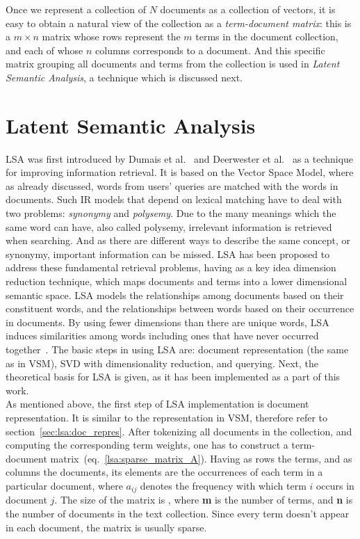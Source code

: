 Once we represent a collection of $N$ documents as a collection of vectors, it is easy to obtain a natural view of the collection as a \textit{term-document matrix}: this is a $m \times n$ matrix whose rows represent the $m$ terms in the document collection, and each of whose $n$ columns corresponds to a document. And this specific matrix grouping all documents and terms from the collection is used in \textit{Latent Semantic Analysis}, a technique which is discussed next.\\

\section{Latent Semantic Analysis}
\gls{LSA} was first introduced by Dumais et al.~\cite{Dumais88usingLSA} and Deerwester et al.~\cite{Deerw90_LSA} as a technique for improving information retrieval. It is based on the Vector Space Model, where as already discussed, words from users' queries are matched with the words in documents. Such \gls{IR} models that depend on lexical matching have to deal with two problems: \textit{synonymy} and \textit{polysemy}. Due to the many meanings which the same word can have, also called polysemy, irrelevant information is retrieved when searching. And as there are different ways to describe the same concept, or synonymy, important information can be missed. \gls{LSA} has been proposed to address these fundamental retrieval problems, having as a key idea dimension reduction technique, which maps documents and terms into a lower dimensional semantic space. \gls{LSA} models the relationships among documents based on their constituent words, and the relationships between words based on their occurrence in documents. By using fewer dimensions than there are unique words, \gls{LSA} induces similarities among words including ones that have never occurred together~\cite{Dumais2006}. The basic steps in using \gls{LSA} are: document representation (the same as in \gls{VSM}), \gls{SVD} with dimensionality reduction, and querying. Next, the theoretical basis for \gls{LSA} is given, as it has been implemented as a part of this work. \\


As mentioned above, the first step of \gls{LSA} implementation is document representation. It is similar to the representation in \gls{VSM}, therefore refer to section~\ref{sec:lsa:doc_repres}. After tokenizing all documents in the collection, and computing the corresponding term weights, one has to construct a term-document matrix~(eq.~\ref{lsa:sparse_matrix_A}). Having as rows the terms, and as columns the documents, its elements are the occurrences of each term in a particular document, where $ a_{ij} $ denotes the frequency with which term $ i $ occurs in document $ j $. The size of the matrix is , where {\bf m} is the number of terms, and {\bf n} is the number of documents in the text collection. Since every term doesn't appear in each document, the matrix is usually sparse. \\

